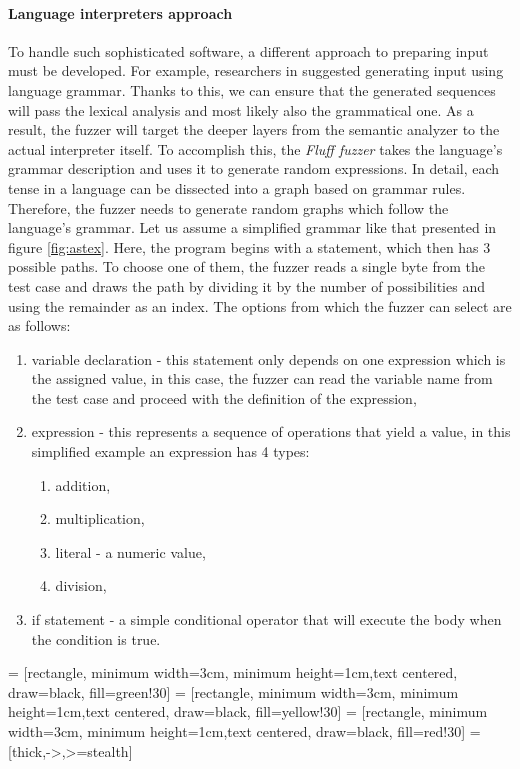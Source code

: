 \paragraph{Language interpreters approach}
To handle such sophisticated software, a different approach to preparing input must be developed. For example, researchers in \cite{dominiak2019efficient} suggested generating input using language grammar. Thanks to this, we can ensure that the generated sequences will pass the lexical analysis and most likely also the grammatical one. As a result, the fuzzer will target the deeper layers from the semantic analyzer to the actual interpreter itself. To accomplish this, the \textit{Fluff fuzzer} takes the language's grammar description and uses it to generate random expressions. In detail, each tense in a language can be dissected into a graph based on grammar rules. Therefore, the fuzzer needs to generate random graphs which follow the language's grammar. Let us assume a simplified grammar like that presented in figure \ref{fig:astex}. Here, the program begins with a statement, which then has 3 possible paths. To choose one of them, the fuzzer reads a single byte from the test case and draws the path by dividing it by the number of possibilities and using the remainder as an index. The options from which the fuzzer can select are as follows:
\begin{enumerate}
    \item variable declaration - this statement only depends on one expression which is the assigned value, in this case, the fuzzer can read the variable name from the test case and proceed with the definition of the expression,
    \item expression - this represents a sequence of operations that yield a value, in this simplified example an expression has 4 types:
    \begin{enumerate}
        \item addition,
        \item multiplication,
        \item literal - a numeric value,
        \item division,
    \end{enumerate}
    \item if statement - a simple conditional operator that will execute the body when the condition is true.
\end{enumerate}

 = [rectangle, minimum width=3cm, minimum height=1cm,text centered, draw=black, fill=green!30]
 = [rectangle, minimum width=3cm, minimum height=1cm,text centered, draw=black, fill=yellow!30]
 = [rectangle, minimum width=3cm, minimum height=1cm,text centered, draw=black, fill=red!30]
 = [thick,->,>=stealth]


